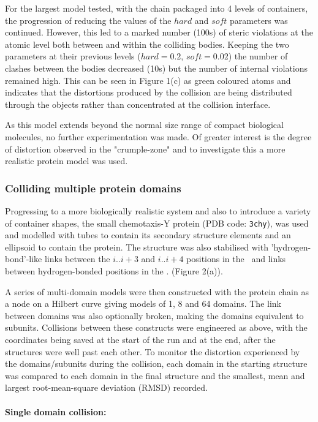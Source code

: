 \documentclass[review]{elsarticle}
\begin{document}
{{{{{For the largest model tested, with the chain packaged into 4 levels of containers,  the
progression of reducing the values of the $hard$ and $soft$ parameters was continued.
However, this led to a marked number (100s) of steric violations at the atomic level both
between and within the colliding bodies.   Keeping the two parameters at their previous
levels ($hard = 0.2$, $soft = 0.02$) the number of clashes between the bodies decreased
(10s) but the number of internal violations remained high.   This can be seen in Figure 1(c)
as green coloured atoms and indicates that the distortions produced by the collision are
being distributed through the objects rather than concentrated at the collision interface.

As this model extends beyond the normal size range of compact biological molecules,
no further experimentation was made.   Of greater interest is the degree of distortion 
observed in the "crumple-zone" and to investigate this a more realistic protein model
was used.


\subsubsection{Colliding multiple protein domains}

Progressing to a more biologically realistic system and also to introduce a variety
of container shapes, the small chemotaxis-Y protein (PDB code: {\tt 3chy}), was used
and modelled with tubes to contain its secondary structure elements and an ellipsoid
to contain the protein.    The structure was also stabilised with 'hydrogen-bond'-like
links between the $i..i+3$ and $i..i+4$ positions in the \AHs\ and links between
hydrogen-bonded positions in the \BS. (Figure 2(a)).

A series of multi-domain models were then constructed with the protein chain as a
node on a Hilbert curve giving models of 1, 8 and 64 domains.   The link between 
domains was also optionally broken, making the domains equivalent to subunits.
Collisions between these constructs were engineered as above, with the coordinates
being saved at the start of the run and at the end, after the structures were well
past each other.    To monitor the distortion experienced by the domains/subunits
during the collision, each domain in the starting structure was compared to each
domain in the final structure and the smallest, mean and largest root-mean-square
deviation (RMSD) recorded. 

\paragraph{Single domain collision:\\}

}}}}}
\end{document}
